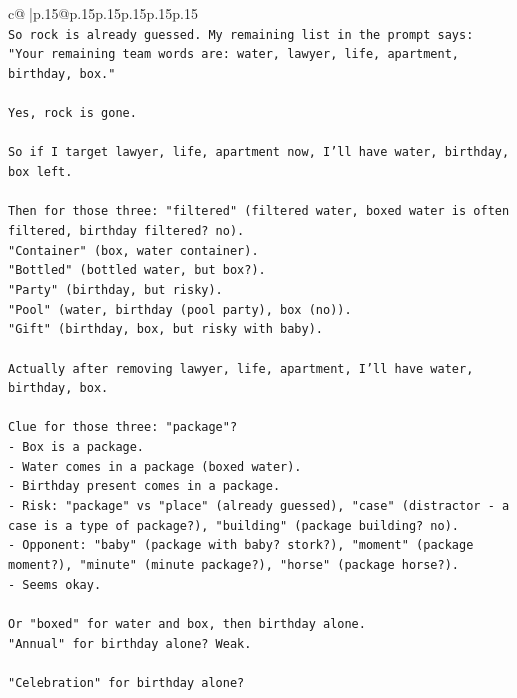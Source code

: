 \documentclass{article}
\begin{document}
{\begin{supertabular}{c@{$\;$}|p{.15\linewidth}@{}p{.15\linewidth}p{.15\linewidth}p{.15\linewidth}p{.15\linewidth}p{.15\linewidth}}
{{{\\ 
\texttt{So rock is already guessed. My remaining list in the prompt says:} \\
\texttt{"Your remaining team words are: water, lawyer, life, apartment, birthday, box."} \\
\\ 
\texttt{Yes, rock is gone.} \\
\\ 
\texttt{So if I target lawyer, life, apartment now, I'll have water, birthday, box left.} \\
\\ 
\texttt{Then for those three: "filtered" (filtered water, boxed water is often filtered, birthday filtered? no).} \\
\texttt{"Container" (box, water container).} \\
\texttt{"Bottled" (bottled water, but box?).} \\
\texttt{"Party" (birthday, but risky).} \\
\texttt{"Pool" (water, birthday (pool party), box (no)).} \\
\texttt{"Gift" (birthday, box, but risky with baby).} \\
\\ 
\texttt{Actually after removing lawyer, life, apartment, I'll have water, birthday, box.} \\
\\ 
\texttt{Clue for those three: "package"?} \\
\texttt{{-} Box is a package.} \\
\texttt{{-} Water comes in a package (boxed water).} \\
\texttt{{-} Birthday present comes in a package.} \\
\texttt{{-} Risk: "package" vs "place" (already guessed), "case" (distractor {-} a case is a type of package?), "building" (package building? no).} \\
\texttt{{-} Opponent: "baby" (package with baby? stork?), "moment" (package moment?), "minute" (minute package?), "horse" (package horse?).} \\
\texttt{{-} Seems okay.} \\
\\ 
\texttt{Or "boxed" for water and box, then birthday alone.} \\
\texttt{"Annual" for birthday alone? Weak.} \\
\\ 
\texttt{"Celebration" for birthday alone?} \\
}}}
\end{supertabular}}
\end{document}
